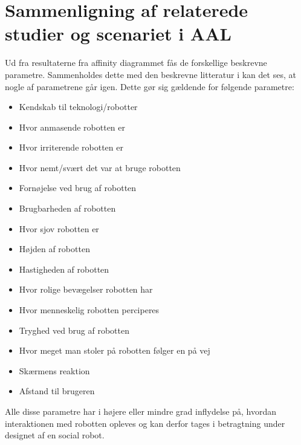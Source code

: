 \section{Sammenligning af relaterede studier og scenariet i AAL}
\label{ParametreTidligereStudier}
%
Ud fra resultaterne fra affinity diagrammet fås de forskellige beskrevne parametre. Sammenholdes dette med den beskrevne litteratur i  kan det ses, at nogle af parametrene går igen. Dette gør sig gældende for følgende parametre:

%
\begin{multicols}{2}
	\begin{itemize}
		\item Kendskab til teknologi/robotter
		\item Hvor anmasende robotten er
		\item Hvor irriterende robotten er
		\item Hvor nemt/svært det var at bruge robotten
		\item Fornøjelse ved brug af robotten
		\item Brugbarheden af robotten
		\item Hvor sjov robotten er
		\item Højden af robotten
		\item Hastigheden af robotten
		\item Hvor rolige bevægelser robotten har
		\item Hvor menneskelig robotten perciperes
		\item Tryghed ved brug af robotten
		\item Hvor meget man stoler på robotten følger en på vej
		\item Skærmens reaktion
		\item Afstand til brugeren
	\end{itemize}
\end{multicols}
\noindent
%
Alle disse parametre har i højere eller mindre grad inflydelse på, hvordan interaktionen med robotten opleves og kan derfor tages i betragtning under designet af en social robot. \blankline
